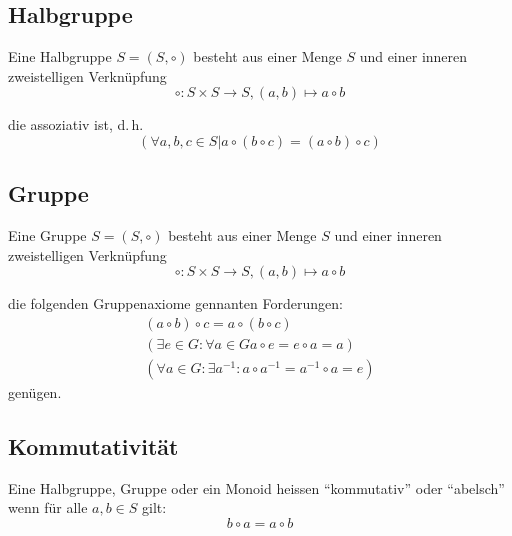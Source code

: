 \documentclass[a4paper, ngerman, landscape, fleqn]{article}
\begin{document}
\begin{multicols*}{3}
\subsection*{Halbgruppe}
Eine Halbgruppe $S = (S, \circ)$ besteht aus einer Menge $S$ und einer inneren zweistelligen Verknüpfung 
\begin{equation*}
    \circ : S \times S \rightarrow S, (a, b) \mapsto a \circ b
\end{equation*}

die assoziativ ist, d.\,h.
\begin{equation*}
    (\forall a, b, c \in S | a \circ (b \circ c) = (a \circ b) \circ c)
\end{equation*}

\subsection*{Gruppe}
Eine Gruppe $S = (S, \circ)$ besteht aus einer Menge $S$ und einer inneren zweistelligen Verknüpfung
\begin{equation*}
    \circ : S \times S \rightarrow S, (a, b) \mapsto a \circ b
\end{equation*}

die folgenden Gruppenaxiome gennanten Forderungen:
\begin{align*}
    (a \circ b) \circ c = a \circ (b \circ c) \\
    (\exists e \in G : \forall a \in G a \circ e = e \circ a = a) \\
    (\forall a \in G : \exists a^{-1} : a \circ a^{-1} = a^{-1} \circ a = e)
\end{align*}
genügen.

\subsection*{Kommutativität}
Eine Halbgruppe, Gruppe oder ein Monoid heissen ``kommutativ'' oder ``abelsch'' wenn für alle $a, b \in S$ gilt:
\begin{equation*}
    b \circ a = a \circ b
\end{equation*}


\end{multicols*}
\end{document}

